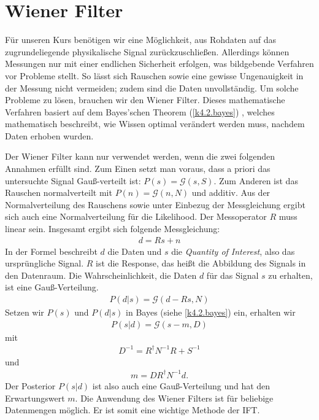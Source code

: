 \section{Wiener Filter}\label{k4.2.wiener.filter}

Für unseren Kurs benötigen wir eine Möglichkeit, aus Rohdaten auf das zugrundeliegende physikalische Signal zurückzuschließen. Allerdings können Messungen nur mit einer endlichen Sicherheit erfolgen, was bildgebende Verfahren vor Probleme stellt. So lässt sich Rauschen sowie eine gewisse Ungenauigkeit in der Messung nicht vermeiden; zudem sind die Daten unvollständig. Um solche Probleme zu lösen, brauchen wir den Wiener Filter.
Dieses mathematische Verfahren basiert auf dem Bayes'schen Theorem
(\ref{k4.2.bayes})
, welches mathematisch beschreibt, wie Wissen optimal verändert werden muss, nachdem Daten erhoben wurden.

Der Wiener Filter kann nur verwendet werden, wenn die zwei folgenden Annahmen erfüllt sind. Zum Einen setzt man voraus, dass a priori das untersuchte Signal Gauß-verteilt ist: $P(s) = \mathcal{G}(s,S)$. Zum Anderen ist das Rauschen normalverteilt mit $P(n) = \mathcal{G}(n,N)$ und additiv. Aus der Normalverteilung des Rauschens sowie unter Einbezug der Messgleichung ergibt sich auch eine Normalverteilung für die Likelihood. Der Messoperator $R$ muss linear sein. Insgesamt ergibt sich folgende Messgleichung:
\begin{eqnarray}
d = Rs + n
\end{eqnarray}
In der Formel beschreibt $d$ die Daten und $s$ die \emph{Quantity of Interest}, also das ursprüngliche Signal. $R$ ist die Response, das heißt die Abbildung des Signals in den Datenraum. Die Wahrscheinlichkeit, die Daten $d$ für das Signal $s$ zu erhalten, ist eine Gauß-Verteilung.
\begin{eqnarray}
P(d|s) = \mathcal{G}(d-Rs,N)
\end{eqnarray}
Setzen wir $P(s)$ und $P(d|s)$ in Bayes (siehe \cref{k4.2.bayes}) ein, erhalten wir
\begin{eqnarray}
P(s|d) = \mathcal{G}(s-m,D)
\end{eqnarray}
mit
\begin{eqnarray}
D^{-1} = R^{\dagger} N^{-1}R + S^{-1}
\end{eqnarray}
und
\begin{eqnarray}
m = D R^{\dagger} N^{-1}d.
\end{eqnarray}
Der Posterior $P(s|d)$ ist also auch eine Gauß-Verteilung und hat den Erwartungswert $m$. Die Anwendung des Wiener Filters ist für beliebige Datenmengen möglich. Er ist somit eine wichtige Methode der IFT.